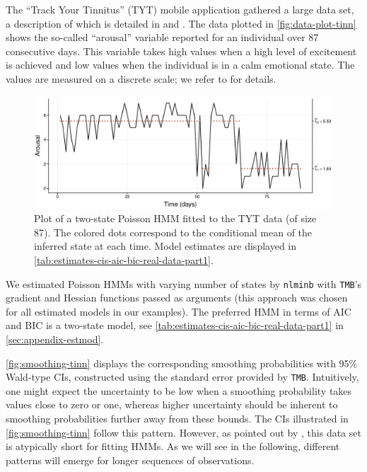 \documentclass[]{interact}\usepackage[]{graphicx}\usepackage[dvipsnames]{xcolor}
\makeatletter
\def\maxwidth{ %
  \ifdim\Gin@nat@width>\linewidth
    \linewidth
  \else
    \Gin@nat@width
  \fi
}
\newenvironment{knitrout}{}{} %
\theoremstyle{plain}%
\theoremstyle{definition}
\theoremstyle{remark}
\makeatother
\begin{document}
The ``Track Your Tinnitus'' (TYT) mobile application gathered a large data set, a description of which is detailed in \cite{pryss} and \cite{pryssa}.
The data plotted in \autoref{fig:data-plot-tinn} shows the so-called ``arousal'' variable reported for an individual over 87 consecutive days.
This variable takes high values when a high level of excitement is achieved and low values when the individual is in a calm emotional state.
The values are measured on a discrete scale; we refer to \cite{probst, probsta} for details.



\begin{knitrout}
\color{fgcolor}\begin{figure}[htb]

{\centering \includegraphics[width=\maxwidth]{figure/data-plot-tinn-1} 

}

\caption{Plot of a two-state Poisson HMM fitted to the TYT data (of size 87). The colored dots correspond to the conditional mean of the inferred state at each time. Model estimates are displayed in \autoref{tab:estimates-cis-aic-bic-real-data-part1}.}\label{fig:data-plot-tinn}
\end{figure}

\end{knitrout}

We estimated Poisson HMMs with varying number of states by \texttt{nlminb} with {\tt{TMB}}'s gradient and Hessian functions passed as arguments (this approach was chosen for all estimated models in our examples). The preferred HMM in terms of AIC and BIC is a two-state model, see \autoref{tab:estimates-cis-aic-bic-real-data-part1} in \autoref{sec:appendix-estmod}. 

\autoref{fig:smoothing-tinn} displays the corresponding smoothing probabilities with 95\% Wald-type CIs, constructed using the standard error provided by {\tt{TMB}}. Intuitively, one might expect the uncertainty to be low when a smoothing probability takes values close to zero or one, whereas higher uncertainty should be inherent to smoothing probabilities further away from these bounds. The CIs illustrated in \autoref{fig:smoothing-tinn} follow this pattern. However, as pointed out by \cite{bacri}, this data set is atypically short for fitting HMMs. As we will see in the following, different patterns will emerge for longer sequences of observations.
\end{document}

